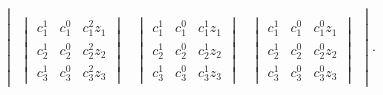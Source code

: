 \begin{example}
\[\begin{vmatrix*}
      \\
      \begin{vmatrix*}
        c_1^1 & c_1^0 & c_1^2 z_1 \\
        c_2^1 & c_2^0 & c_2^2 z_2 \\
        c_3^1 & c_3^0 & c_3^2 z_3 
      \end{vmatrix*}
      &
      \begin{vmatrix*}
        c_1^1 & c_1^0 & c_1^1 z_1 \\
        c_2^1 & c_2^0 & c_2^1 z_2 \\
        c_3^1 & c_3^0 & c_3^1 z_3 
      \end{vmatrix*}
      &
      \begin{vmatrix*}
        c_1^1 & c_1^0 & c_1^0 z_1 \\
        c_2^1 & c_2^0 & c_2^0 z_2 \\
        c_3^1 & c_3^0 & c_3^0 z_3 
      \end{vmatrix*}
    \end{vmatrix*}.
  \]
  \endgroup
\end{example}

